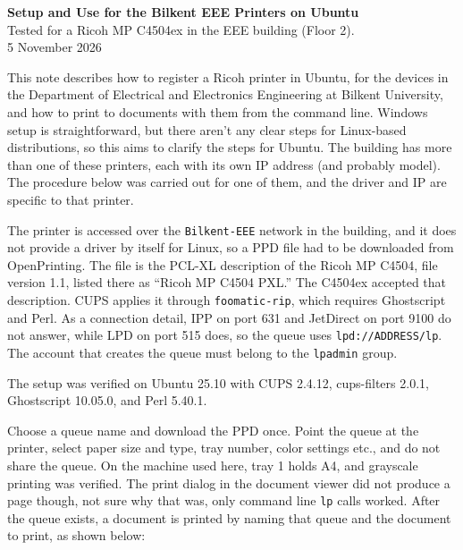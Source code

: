 \documentclass[10pt]{article}
\begin{document}
\begin{center}
{\Large\bfseries Setup and Use for the Bilkent EEE Printers on Ubuntu}\\[0.3em]
{\normalsize Tested for a Ricoh MP C4504ex in the EEE building (Floor 2).}\\[0.25em]
{\normalsize 5 November 2026}
\end{center}

This note describes how to register a Ricoh printer in Ubuntu, for the devices in the Department of Electrical and Electronics Engineering at Bilkent University, and how to print to documents with them from the command line. Windows setup is straightforward, but there aren't any clear steps for Linux-based distributions, so this aims to clarify the steps for Ubuntu. The building has more than one of these printers, each with its own IP address (and probably model). The procedure below was carried out for one of them, and the driver and IP are specific to that printer.

\vspace{12 px}

The printer is accessed over the \texttt{Bilkent-EEE} network in the building, and it does not provide a driver by itself for Linux, so a PPD file had to be downloaded from OpenPrinting. The file is the PCL-XL description of the Ricoh MP C4504, file version 1.1, listed there as ``Ricoh MP C4504 PXL.'' The C4504ex accepted that description. CUPS applies it through \texttt{foomatic-rip}, which requires Ghostscript and Perl. As a connection detail, IPP on port 631 and JetDirect on port 9100 do not answer, while LPD on port 515 does, so the queue uses \texttt{lpd://ADDRESS/lp}. The account that creates the queue must belong to the \texttt{lpadmin} group.

The setup was verified on Ubuntu 25.10 with CUPS 2.4.12, cups-filters 2.0.1, Ghostscript 10.05.0, and Perl 5.40.1.

\vspace{12 px}

Choose a queue name and download the PPD once. Point the queue at the printer, select paper size and type, tray number, color settings etc., and do not share the queue. On the machine used here, tray 1 holds A4, and grayscale printing was verified. The print dialog in the document viewer did not produce a page though, not sure why that was, only command line \texttt{lp} calls worked. After the queue exists, a document is printed by naming that queue and the document to print, as shown below:
\end{document}
